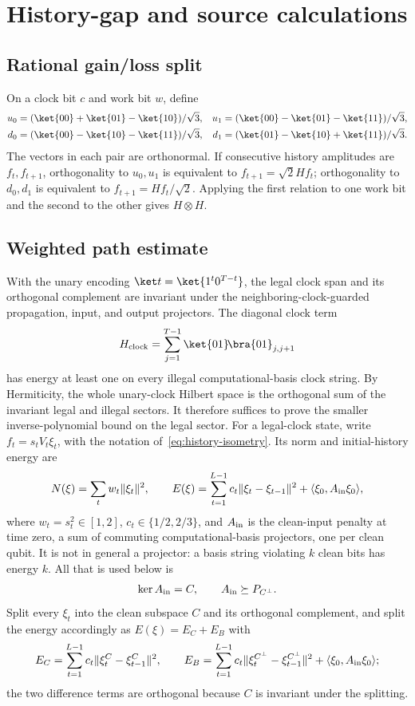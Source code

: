 \section{History-gap and source calculations}
\label{app:source-details}

\subsection{Rational gain/loss split}
\label{app:rational-split}

On a clock bit \(c\) and work bit \(w\), define
\[
\begin{aligned}
u_0&=(\ket{00}+\ket{01}-\ket{10})/\sqrt3,&
u_1&=(\ket{00}-\ket{01}-\ket{11})/\sqrt3,\\
d_0&=(\ket{00}-\ket{10}-\ket{11})/\sqrt3,&
d_1&=(\ket{01}-\ket{10}+\ket{11})/\sqrt3.
\end{aligned}
\]
The vectors in each pair are orthonormal.  If consecutive history amplitudes
are \(f_t,f_{t+1}\), orthogonality to \(u_0,u_1\) is equivalent to
\(f_{t+1}=\sqrt2Hf_t\); orthogonality to \(d_0,d_1\) is equivalent to
\(f_{t+1}=Hf_t/\sqrt2\).  Applying the first relation to one work bit and the
second to the other gives \(H\otimes H\).

\subsection{Weighted path estimate}

With the unary encoding \(\ket t=\ket{1^t0^{T-t}}\), the legal clock span and
its orthogonal complement are invariant under the neighboring-clock-guarded
propagation, input, and output projectors.  The diagonal clock term
\[
H_{\rm clock}=\sum_{j=1}^{T-1}\ket{01}\!\bra{01}_{j,j+1}
\]
has energy at least one on every illegal computational-basis clock string.
By Hermiticity, the whole unary-clock Hilbert space is the orthogonal sum of
the invariant legal and illegal sectors.  It therefore
suffices to prove the smaller inverse-polynomial bound on the legal sector.
For a legal-clock state, write \(f_t=s_tV_t\xi_t\), with the notation of~\cref{eq:history-isometry}. Its norm and initial-history energy are
\[
N(\xi)=\sum_tw_t\|\xi_t\|^2,
\qquad
E(\xi)=\sum_{t=1}^{L-1}c_t\|\xi_t-\xi_{t-1}\|^2
+\langle\xi_0,A_{\rm in}\xi_0\rangle,
\]
where \(w_t=s_t^2\in[1,2]\), \(c_t\in\{1/2,2/3\}\), and
\(A_{\rm in}\) is the clean-input penalty at time zero, a sum of commuting
computational-basis projectors, one per clean qubit.  It is not in general a
projector: a basis string violating \(k\) clean bits has energy \(k\).  All
that is used below is
\[
\ker A_{\rm in}=C,\qquad A_{\rm in}\succeq P_{C^\perp}.
\]
Split every \(\xi_t\) into the clean subspace \(C\) and its orthogonal
complement, and split the energy accordingly as \(E(\xi)=E_C+E_B\) with
\[
E_C=\sum_{t=1}^{L-1}c_t\|\xi_t^C-\xi_{t-1}^C\|^2,\qquad
E_B=\sum_{t=1}^{L-1}c_t\|\xi_t^{C^\perp}-\xi_{t-1}^{C^\perp}\|^2
+\langle\xi_0,A_{\rm in}\xi_0\rangle ;
\]
the two difference terms are orthogonal because \(C\) is invariant under
the splitting.

